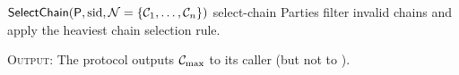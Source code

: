 \begin{cccProtocol}
    {$\textsf{SelectChain}(\mathsf{P}, \mathrm{sid}, \mathcal{N} = \{ \mathcal{C}_1, \ldots , \mathcal{C}_n \})$}
    {select-chain}
    {Parties filter invalid chains and apply the heaviest chain selection rule.}

    \begin{algorithmic}[1]

        \EndFor

    \end{algorithmic}

    \textsc{Output}: The protocol outputs $\mathcal{C}_{\max}$ to its caller (but not to \Z).
\end{cccProtocol}